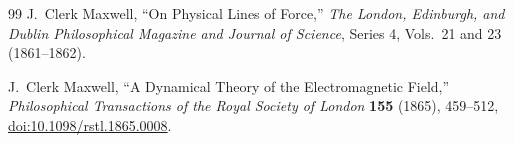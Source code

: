 \begin{thebibliography}{99}
J.~Clerk Maxwell,
``On Physical Lines of Force,''
\emph{The London, Edinburgh, and Dublin Philosophical Magazine and Journal of Science},
Series 4, Vols.~21 and 23 (1861--1862).

J.~Clerk Maxwell,
``A Dynamical Theory of the Electromagnetic Field,''
\emph{Philosophical Transactions of the Royal Society of London}
\textbf{155} (1865), 459--512,
\href{https://doi.org/10.1098/rstl.1865.0008}{doi:10.1098/rstl.1865.0008}.
\end{thebibliography}
